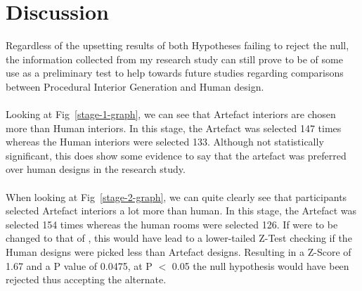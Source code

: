\section{Discussion}
Regardless of the upsetting results of both Hypotheses failing to reject the null, the information collected from my research study can still prove to be of some use as a preliminary test to help towards future studies regarding comparisons between Procedural Interior Generation and Human design.
\\
\\
Looking at Fig~\ref{stage-1-graph}, we can see that Artefact interiors are chosen more than Human interiors. In this stage, the Artefact was selected 147 times whereas the Human interiors were selected 133. Although not statistically significant, this does show some evidence to say that the artefact was preferred over human designs in the research study.
\\
\\
When looking at Fig~\ref{stage-2-graph}, we can quite clearly see that participants selected Artefact interiors a lot more than human. In this stage, the Artefact was selected 154 times whereas the human rooms were selected 126. If  were to be changed to that of , this would have lead to a lower-tailed Z-Test checking if the Human designs were picked less than Artefact designs. Resulting in a Z-Score of 1.67 and a P value of 0.0475, at P $<$ 0.05 the null hypothesis would have been rejected thus accepting the alternate.